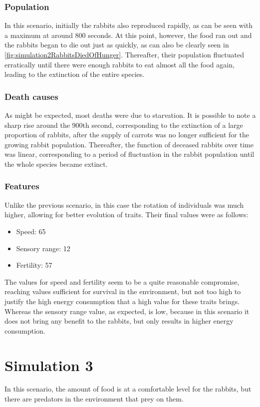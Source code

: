 \subsubsection{Population}
In this scenario, initially the rabbits also reproduced rapidly, as can be seen with a maximum at around 800 seconds. At this point, however, the food ran out and the rabbits began to die out just as quickly, as can also be clearly seen in \autoref{fig:simulation2RabbitsDiedOfHunger}. Thereafter, their population fluctuated erratically until there were enough rabbits to eat almost all the food again, leading to the extinction of the entire species.

\subsubsection{Death causes}
As might be expected, most deaths were due to starvation. It is possible to note a sharp rise around the 900th second, corresponding to the extinction of a large proportion of rabbits, after the supply of carrots was no longer sufficient for the growing rabbit population. Thereafter, the function of deceased rabbits over time was linear, corresponding to a period of fluctuation in the rabbit population until the whole species became extinct.

\subsubsection{Features}
Unlike the previous scenario, in this case the rotation of individuals was much higher, allowing for better evolution of traits. Their final values were as follows:
\begin{itemize}
    \item Speed: 65
    \item Sensory range: 12
    \item Fertility: 57
\end{itemize}
The values for speed and fertility seem to be a quite reasonable compromise, reaching values sufficient for survival in the environment, but not too high to justify the high energy consumption that a high value for these traits brings. Whereas the sensory range value, as expected, is low, because in this scenario it does not bring any benefit to the rabbits, but only results in higher energy consumption.

\section{Simulation 3}
In this scenario, the amount of food is at a comfortable level for the rabbits, but there are predators in the environment that prey on them.
